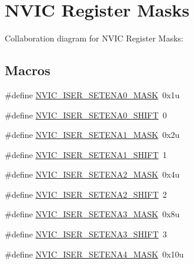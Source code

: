 \hypertarget{group___n_v_i_c___register___masks}{}\section{N\+V\+IC Register Masks}
\label{group___n_v_i_c___register___masks}
Collaboration diagram for N\+V\+IC Register Masks\+:
\subsection*{Macros}
\begin{DoxyCompactItemize}
\item 
\#define \hyperlink{group___n_v_i_c___register___masks_gade84d6ce234da2232d63de2a7d920566}{N\+V\+I\+C\+\_\+\+I\+S\+E\+R\+\_\+\+S\+E\+T\+E\+N\+A0\+\_\+\+M\+A\+SK}~0x1u
\item 
\#define \hyperlink{group___n_v_i_c___register___masks_gad891fffc0f454fd2dd8fd484ed835412}{N\+V\+I\+C\+\_\+\+I\+S\+E\+R\+\_\+\+S\+E\+T\+E\+N\+A0\+\_\+\+S\+H\+I\+FT}~0
\item 
\#define \hyperlink{group___n_v_i_c___register___masks_gaa052596053f5deb896778cf07ae07332}{N\+V\+I\+C\+\_\+\+I\+S\+E\+R\+\_\+\+S\+E\+T\+E\+N\+A1\+\_\+\+M\+A\+SK}~0x2u
\item 
\#define \hyperlink{group___n_v_i_c___register___masks_ga9498e7a628361dcfb00f7cea08fb58f4}{N\+V\+I\+C\+\_\+\+I\+S\+E\+R\+\_\+\+S\+E\+T\+E\+N\+A1\+\_\+\+S\+H\+I\+FT}~1
\item 
\#define \hyperlink{group___n_v_i_c___register___masks_ga4336c0d4aaca32a9f97f5c7558ffe88d}{N\+V\+I\+C\+\_\+\+I\+S\+E\+R\+\_\+\+S\+E\+T\+E\+N\+A2\+\_\+\+M\+A\+SK}~0x4u
\item 
\#define \hyperlink{group___n_v_i_c___register___masks_ga7b3a1e9d213bb5650183eda218c0b7c7}{N\+V\+I\+C\+\_\+\+I\+S\+E\+R\+\_\+\+S\+E\+T\+E\+N\+A2\+\_\+\+S\+H\+I\+FT}~2
\item 
\#define \hyperlink{group___n_v_i_c___register___masks_ga3aedf59ff8f12612a8e93548187e6f97}{N\+V\+I\+C\+\_\+\+I\+S\+E\+R\+\_\+\+S\+E\+T\+E\+N\+A3\+\_\+\+M\+A\+SK}~0x8u
\item 
\#define \hyperlink{group___n_v_i_c___register___masks_ga6475b611d052df053512bd2f03995b2e}{N\+V\+I\+C\+\_\+\+I\+S\+E\+R\+\_\+\+S\+E\+T\+E\+N\+A3\+\_\+\+S\+H\+I\+FT}~3
\item 
\#define \hyperlink{group___n_v_i_c___register___masks_gabdbd6628a7a230c8110f7d2b944e4766}{N\+V\+I\+C\+\_\+\+I\+S\+E\+R\+\_\+\+S\+E\+T\+E\+N\+A4\+\_\+\+M\+A\+SK}~0x10u
\item 

\end{DoxyCompactItemize}

